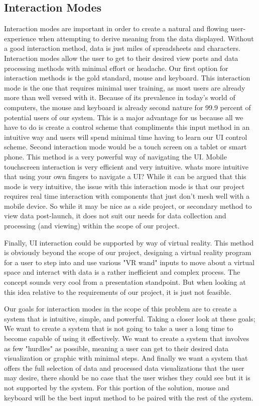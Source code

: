 \documentclass[10pt,draftclsnofoot,onecolumn,retainorgcmds]{IEEEtran}
\begin{document}
\subsection{Interaction Modes}
Interaction modes are important in order to create a natural and flowing user-experience when attempting to derive meaning from the data displayed. Without a good interaction method, data is just miles of spreadsheets and characters. Interaction modes allow the user to get to their desired view ports and data processing methods with minimal effort or headache.
Our first option for interaction methods is the gold standard, mouse and keyboard. This interaction mode is the one that requires minimal user training, as most users are already more than well versed with it. Because of its prevalence in today's world of computers, the mouse and keyboard is already second nature for 99.9 percent of potential users of our system. This is a major advantage for us because all we have to do is create a control scheme that compliments this input method in an intuitive way and users will spend minimal time having to learn our UI control scheme.
Second interaction mode would be a touch screen on a tablet or smart phone. This method is a very powerful way of navigating the UI. Mobile touchscreen interaction is very efficient and very intuitive. whats more intuitive that using your own fingers to navigate a UI? While it can be argued that this mode is very intuitive, the issue with this interaction mode is that our project requires real time interaction with components that just don't mesh well with a mobile device. So while it may be nice as a side project, or secondary method to view data post-launch, it does not suit our needs for data collection and processing (and viewing) within the scope of our project.\par
Finally, UI interaction could be supported by way of virtual reality. This method is obviously beyond the scope of our project, designing a virtual reality program for a user to step into and use various "VR wand" inputs to move about a virtual space and interact with data is a rather inefficient and complex process. The concept sounds very cool from a presentation standpoint. But when looking at this idea relative to the requirements of our project, it is just not feasible.\par
Our goals for interaction modes in the scope of this problem are to create a system that is intuitive, simple, and powerful. Taking a closer look at these goals; We want to create a system that is not going to take a user a long time to become capable of using it effectively. We want to create a system that involves as few "hurdles" as possible, meaning a user can get to their desired data visualization or graphic with minimal steps. And finally we want a system that offers the full selection of data and processed data visualizations that the user may desire, there should be no case that the user wishes they could see but it is not supported by the system. For this portion of the solution, mouse and keyboard will be the best input method to be paired with the rest of the system. \par
\end{document}
